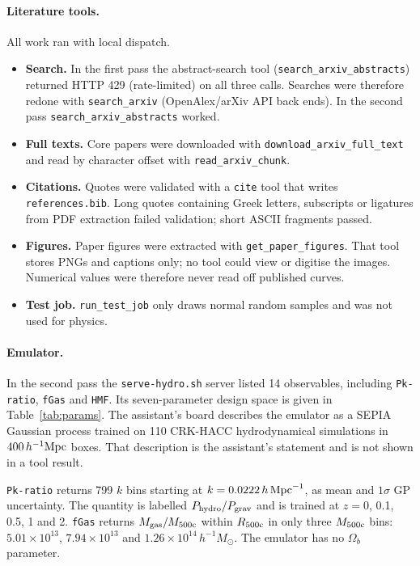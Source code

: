 \documentclass[11pt,a4paper]{article}
\begin{document}
\paragraph{Literature tools.} All work ran with local dispatch.
\begin{itemize}
\item \textbf{Search.} In the first pass the abstract-search tool (\texttt{search\_arxiv\_abstracts}) returned HTTP 429 (rate-limited) on all three calls. Searches were therefore redone with \texttt{search\_arxiv} (OpenAlex/arXiv API back ends). In the second pass \texttt{search\_arxiv\_abstracts} worked.
\item \textbf{Full texts.} Core papers were downloaded with \texttt{download\_arxiv\_full\_text} and read by character offset with \texttt{read\_arxiv\_chunk}.
\item \textbf{Citations.} Quotes were validated with a \texttt{cite} tool that writes \texttt{references.bib}. Long quotes containing Greek letters, subscripts or ligatures from PDF extraction failed validation; short ASCII fragments passed.
\item \textbf{Figures.} Paper figures were extracted with \texttt{get\_paper\_figures}. That tool stores PNGs and captions only; no tool could view or digitise the images. Numerical values were therefore never read off published curves.
\item \textbf{Test job.} \texttt{run\_test\_job} only draws normal random samples and was not used for physics.
\end{itemize}

\paragraph{Emulator.} In the second pass the \texttt{serve-hydro.sh} server listed 14 observables, including \texttt{Pk-ratio}, \texttt{fGas} and \texttt{HMF}. Its seven-parameter design space is given in Table~\ref{tab:params}. The assistant's board describes the emulator as a SEPIA Gaussian process trained on 110 CRK-HACC hydrodynamical simulations in $400\,h^{-1}{\rm Mpc}$ boxes. That description is the assistant's statement and is not shown in a tool result.

\texttt{Pk-ratio} returns 799 $k$ bins starting at $k=0.0222\,h\,{\rm Mpc}^{-1}$, as mean and $1\sigma$ GP uncertainty. The quantity is labelled $P_{\rm hydro}/P_{\rm grav}$ and is trained at $z=0$, 0.1, 0.5, 1 and 2. \texttt{fGas} returns $M_{\rm gas}/M_{\rm 500c}$ within $R_{\rm 500c}$ in only three $M_{\rm 500c}$ bins: $5.01\times10^{13}$, $7.94\times10^{13}$ and $1.26\times10^{14}\,h^{-1}M_\odot$. The emulator has no $\Omega_b$ parameter.
\end{document}
